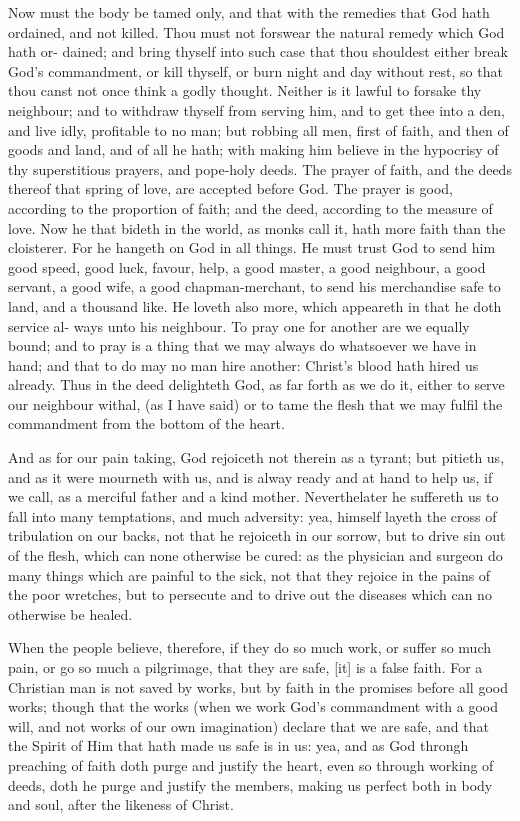 \documentclass{custom}
\begin{document}
Now must the body be tamed only, and that with the 
remedies that God hath ordained, and not killed. Thou 
must not forswear the natural remedy which God hath or- 
dained; and bring thyself into such case that thou shouldest 
either break God's commandment, or kill thyself, or 
burn night and day without rest, so that thou canst not 
once think a godly thought. Neither is it lawful to forsake 
thy neighbour; and to withdraw thyself from serving him, 
and to get thee into a den, and live idly, profitable to no 
man; but robbing all men, first of faith, and then of goods 
and land, and of all he hath; with making him believe in 
the hypocrisy of thy superstitious prayers, and pope-holy 
deeds. The prayer of faith, and the deeds thereof that
spring of love, are accepted before God. The prayer is
good, according to the proportion of faith; and the deed,
according to the measure of love. Now he that bideth
in the world, as monks call it, hath more faith than the
cloisterer. For he hangeth on God in all things. He
must trust God to send him good speed, good luck,
favour, help, a good master, a good neighbour, a good 
servant, a good wife, a good chapman-merchant, to send 
his merchandise safe to land, and a thousand like. He 
loveth also more, which appeareth in that he doth service al- 
ways unto his neighbour. To pray one for another are we 
equally bound; and to pray is a thing that we may always 
do whatsoever we have in hand; and that to do may no man 
hire another: Christ's blood hath hired us already. Thus 
in the deed delighteth God, as far forth as we do it, either 
to serve our neighbour withal, (as I have said) or to tame 
the flesh that we may fulfil the commandment from the 
bottom of the heart. 

And as for our pain taking, God rejoiceth not therein 
as a tyrant; but pitieth us, and as it were mourneth with 
us, and is alway ready and at hand to help us, if we call, 
as a merciful father and a kind mother. Neverthelater 
he suffereth us to fall into many temptations, and much 
adversity: yea, himself layeth the cross of tribulation on 
our backs, not that he rejoiceth in our sorrow, but to 
drive sin out of the flesh, which can none otherwise be 
cured: as the physician and surgeon do many things which 
are painful to the sick, not that they rejoice in the pains 
of the poor wretches, but to persecute and to drive out 
the diseases which can no otherwise be healed. 

When the people believe, therefore, if they do so 
much work, or suffer so much pain, or go so much a 
pilgrimage, that they are safe, [it] is a false faith. For a 
Christian man is not saved by works, but by faith in the 
promises before all good works; though that the works 
(when we work God's commandment with a good will, 
and not works of our own imagination) declare that we 
are safe, and that the Spirit of Him that hath made us 
safe is in us: yea, and as God throngh preaching of faith 
doth purge and justify the heart, even so through working 
of deeds, doth he purge and justify the members, making 
us perfect both in body and soul, after the likeness of 
Christ. 
\end{document}
